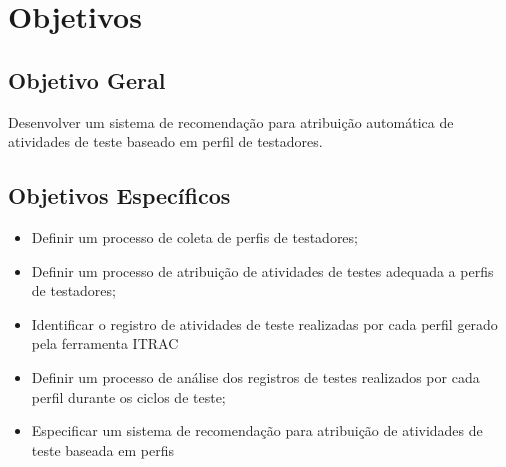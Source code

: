 \section{Objetivos}
\subsection{Objetivo Geral}

Desenvolver um sistema de recomendação para atribuição automática de atividades de teste baseado em perfil de testadores.

\subsection{Objetivos Específicos}

\begin{itemize}
		\item Definir um processo de coleta de perfis de testadores;
		\item Definir um processo de atribuição de atividades de testes adequada a perfis de testadores;
		\item Identificar o registro de atividades de teste realizadas por cada perfil gerado pela ferramenta ITRAC
		\item Definir um processo de análise dos registros de testes realizados por cada perfil durante os ciclos de teste;
		\item Especificar um sistema de recomendação para atribuição de atividades de teste baseada em perfis
	\end{itemize}
